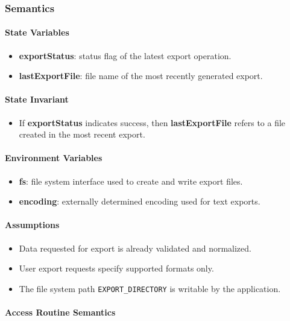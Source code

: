 \documentclass[12pt, titlepage]{article}
\begin{document}
\subsubsection{Semantics}

\paragraph{State Variables}
\begin{itemize}
  \item \textbf{exportStatus}: status flag of the latest export operation.
  \item \textbf{lastExportFile}: file name of the most recently generated export.
\end{itemize}

\paragraph{State Invariant}
\begin{itemize}
  \item If \textbf{exportStatus} indicates success, then \textbf{lastExportFile} refers to a file created in the most recent export.
\end{itemize}

\paragraph{Environment Variables}
\begin{itemize}
  \item \textbf{fs}: file system interface used to create and write export files.
  \item \textbf{encoding}: externally determined encoding used for text exports.
\end{itemize}

\paragraph{Assumptions}
\begin{itemize}
  \item Data requested for export is already validated and normalized.
  \item User export requests specify supported formats only.
  \item The file system path \texttt{EXPORT\_DIRECTORY} is writable by the application.
\end{itemize}

\paragraph{Access Routine Semantics}
\end{document}
